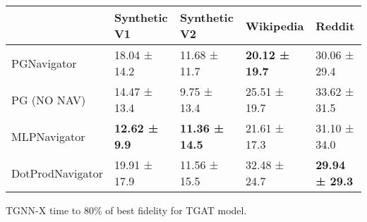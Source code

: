 \begin{tabular}{lllll}
\toprule
 & Synthetic V1 & Synthetic V2 & Wikipedia & Reddit \\
\midrule
PGNavigator & 18.04 ± 14.2 & 11.68 ± 11.7 & \bfseries 20.12 ± 19.7 & 30.06 ± 29.4 \\
PG (NO NAV) & 14.47 ± 13.4 & 9.75 ± 13.4 & 25.51 ± 19.7 & 33.62 ± 31.5 \\
MLPNavigator & \bfseries 12.62 ± 9.9 & \bfseries 11.36 ± 14.5 & 21.61 ± 17.3 & 31.10 ± 34.0 \\
DotProdNavigator & 19.91 ± 17.9 & 11.56 ± 15.5 & 32.48 ± 24.7 & \bfseries 29.94 ± 29.3 \\
\bottomrule
\end{tabular}
\caption{\label{tab:tgat_time}TGNN-X time to 80\% of best fidelity for TGAT model.}

